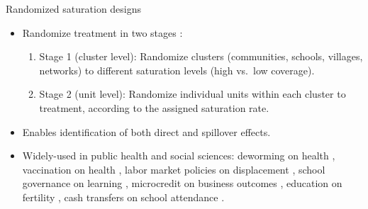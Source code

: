 \documentclass[aspectratio=169]{beamer}
\begin{document}


\begin{frame}{Randomized saturation designs}
\begin{itemize}
    \item Randomize treatment in two stages \citep{hudgens2008toward, baird2018optimal, basse2018analyzing}:
        \begin{enumerate}
        \item {Stage 1 (cluster level):} Randomize clusters (communities, schools, villages, networks) to different saturation levels (high vs.\ low coverage).
        \item {Stage 2 (unit level):} Randomize individual units within each cluster to treatment, according to the assigned saturation rate.
        \end{enumerate}
    \item Enables identification of both direct and spillover effects.
    \pause
    \item Widely-used in public health and social sciences: deworming on health \citep{miguel2004worms}, vaccination on health \citep{ali2005herd}, labor market policies on displacement \citep{crepon2013labor}, school governance on learning \citep{pradhan2014improving}, microcredit on business outcomes \citep{banerjee2015miracle}, education on fertility \citep{duflo2015education}, cash transfers on school attendance \citep{barrera2019long}.
\end{itemize}
\end{frame}
\end{document}
